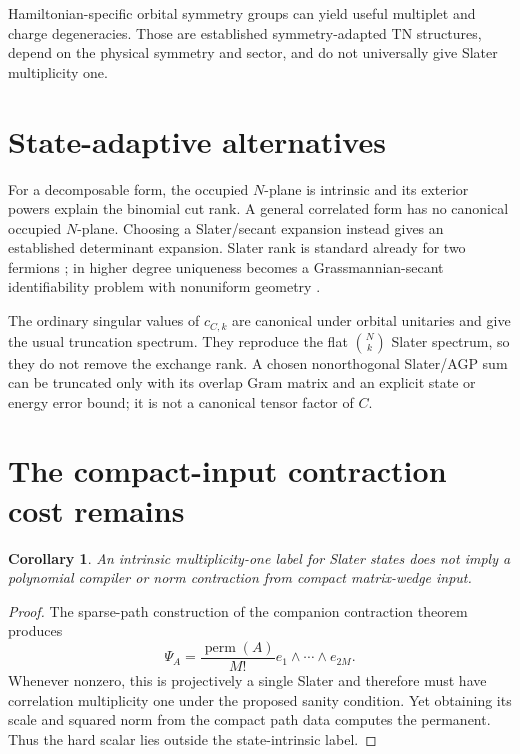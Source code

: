 \documentclass[11pt]{article}
\newtheorem{corollary}[theorem]{Corollary}
\begin{document}
Hamiltonian-specific orbital symmetry groups can yield useful multiplet and
charge degeneracies. Those are established symmetry-adapted TN structures,
depend on the physical symmetry and sector, and do not universally give Slater
multiplicity one.

\section{State-adaptive alternatives}

For a decomposable form, the occupied $N$-plane is intrinsic and its exterior
powers explain the binomial cut rank. A general correlated form has no
canonical occupied $N$-plane. Choosing a Slater/secant expansion instead gives
an established determinant expansion. Slater rank is standard already for two
fermions \cite{SchliemannEtAl2001}; in higher degree uniqueness becomes a
Grassmannian-secant identifiability problem with nonuniform geometry
\cite{BallicoEtAl2013,GalganoStaffolani2024}.

The ordinary singular values of $c_{C,k}$ are canonical under orbital
unitaries and give the usual truncation spectrum. They reproduce the flat
$\binom Nk$ Slater spectrum, so
they do not remove the exchange rank. A chosen nonorthogonal Slater/AGP sum can
be truncated only with its overlap Gram matrix and an explicit state or energy
error bound; it is not a canonical tensor factor of $C$.

\section{The compact-input contraction cost remains}

\begin{corollary}
An intrinsic multiplicity-one label for Slater states does not imply a
polynomial compiler or norm contraction from compact matrix-wedge input.
\end{corollary}

\begin{proof}
The sparse-path construction of the companion contraction theorem produces
\[
 \Psi_A=\frac{\operatorname{perm}(A)}{M!}
 e_1\wedge\cdots\wedge e_{2M}.
\]
Whenever nonzero, this is projectively a single Slater and therefore must have
correlation multiplicity one under the proposed sanity condition. Yet obtaining
its scale and squared norm from the compact path data computes the permanent.
Thus the hard scalar lies outside the state-intrinsic label.
\end{proof}
\end{document}

